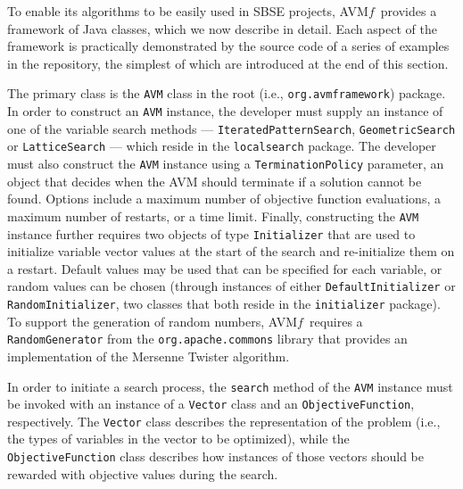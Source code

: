\documentclass{llncs}
\newcommand{\name}{\mbox{AVM\hspace{-1pt}$f$}\xspace}
\newcommand{\inlineheading}[1]{\vspace{1mm} \noindent {\bf #1.}}
\begin{document}
To enable its algorithms to be easily used in SBSE projects, \name~provides a framework of Java classes, which we now describe in detail. Each aspect of the framework is practically demonstrated by the source code of a series of examples in the repository, the simplest of which are introduced at the end of this section.

\begin{sloppypar} \inlineheading{Configuring an AVM Search} The primary class is the {\tt AVM} class in the root (i.e., {\tt org.avmframework}) package. In order to construct an {\tt AVM} instance, the developer must supply an instance of one of the variable search methods --- {\tt IteratedPatternSearch}, {\tt GeometricSearch} or {\tt LatticeSearch} --- which reside in the {\tt localsearch} package. The developer must also construct the {\tt AVM} instance using a {\tt TerminationPolicy} parameter, an object that decides when the AVM should terminate if a solution cannot be found. Options include a maximum number of objective function evaluations, a maximum number of restarts, or a time limit. Finally, constructing the {\tt AVM} instance further requires two objects of type {\tt Initializer} that are used to initialize variable vector values at the start of the search and re-initialize them on a restart. Default values may be used that can be specified for each variable, or random values can be chosen (through instances of either {\tt DefaultInitializer} or {\tt RandomInitializer}, two classes that both reside in the {\tt initializer} package). To support the generation of random numbers, \name~requires a {\tt RandomGenerator} from the {\tt org.apache.commons} library that provides an implementation of the Mersenne Twister algorithm. \end{sloppypar}

\begin{sloppypar}
In order to initiate a search process, the {\tt search} method of the {\tt AVM} instance must be invoked with an instance of a {\tt Vector} class and an {\tt ObjectiveFunction}, respectively. The {\tt Vector} class describes the representation of the problem
(i.e., the types of variables in the vector to be optimized), while the {\tt ObjectiveFunction} class describes how instances of those vectors should be rewarded with objective values during the search.
\end{sloppypar}
\end{document}
